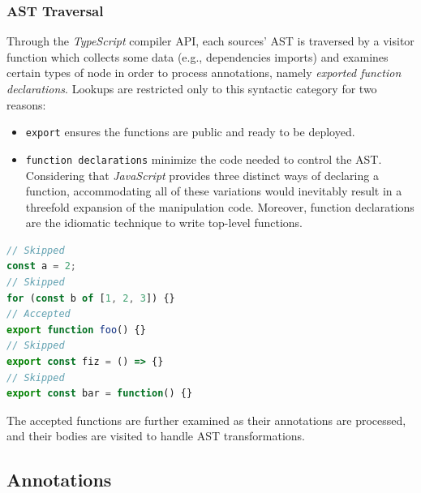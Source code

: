 \subsubsection{AST Traversal}

Through the \textit{TypeScript} compiler API, each sources' AST is traversed
by a visitor function which collects some data (e.g., dependencies imports) and examines
certain types of node in order to process annotations, namely \textit{exported function declarations}.
Lookups are restricted only to this syntactic category for two reasons:
\begin{itemize}
  \item \verb|export| ensures the functions are public and ready to be deployed.
  \item \verb|function declarations| minimize the code needed to control the AST.
    Considering that \textit{JavaScript} provides three distinct ways of declaring a function,
    accommodating all of these variations would inevitably result in a threefold expansion of the manipulation code.
    Moreover, function declarations are the idiomatic technique to write top-level functions.
\end{itemize}

\begin{lstlisting}[language=javascript, caption={Examples of examined or skipped nodes.}]
// Skipped
const a = 2;
// Skipped
for (const b of [1, 2, 3]) {}
// Accepted
export function foo() {}
// Skipped
export const fiz = () => {}
// Skipped
export const bar = function() {}
\end{lstlisting}

The accepted functions are further examined as their annotations are processed, and
their bodies are visited to handle AST transformations.

\subsection{Annotations}

